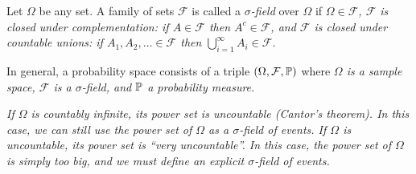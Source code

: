 \begin{definition}
Let $\Omega$ be any set. A family of sets $\mathcal{F}$ is called a \emph{$\sigma$-field} over $\Omega$ if 
\ben
\it $\Omega\in\mathcal{F}$,
\it $\mathcal{F}$ is closed under complementation: if $A\in\mathcal{F}$ then $A^c\in\mathcal{F}$, and
\it $\mathcal{F}$ is closed under countable unions: if $A_1,A_2,\ldots\in\mathcal{F}$ then $\bigcup_{i=1}^{\infty}A_i \in\mathcal{F}$.
\een
\end{definition}

In general, a probability space consists of a triple $(\Omega,\mathcal{F},\mathbb{P})$ where
\ben
\it $\Omega$ is a sample space,
\it $\mathcal{F}$ is a $\sigma$-field, and 
\it $\mathbb{P}$ a probability measure.%
\een


\begin{remark}[Cardinality]
\mbox{}\par\vspace{-3ex}
\bit
\it If $\Omega$ is countably infinite, its power set is uncountable (Cantor's theorem).
	\bit
	\it In this case, we can still use the power set of $\Omega$ as a $\sigma$-field of events.
	\eit
\it If $\Omega$ is uncountable, its power set is ``very uncountable''.
	\bit
	\it In this case, the power set of $\Omega$ is simply too big, and we must define an explicit $\sigma$-field of events.%
	\eit
\eit


\end{remark}




